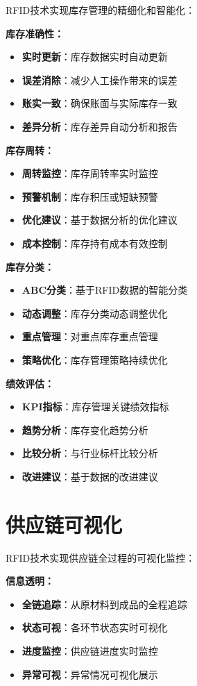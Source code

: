 \documentclass[12pt,UTF8]{ctexbook}
\begin{document}
\begin{itemize}[leftmargin=3.5em]
\begin{itemize}[leftmargin=3.5em]
RFID技术实现库存管理的精细化和智能化：

\textbf{库存准确性：}
\begin{itemize}[leftmargin=3.5em]
    \item \textbf{实时更新}：库存数据实时自动更新
    \item \textbf{误差消除}：减少人工操作带来的误差
    \item \textbf{账实一致}：确保账面与实际库存一致
    \item \textbf{差异分析}：库存差异自动分析和报告
\end{itemize}

\textbf{库存周转：}
\begin{itemize}[leftmargin=3.5em]
    \item \textbf{周转监控}：库存周转率实时监控
    \item \textbf{预警机制}：库存积压或短缺预警
    \item \textbf{优化建议}：基于数据分析的优化建议
    \item \textbf{成本控制}：库存持有成本有效控制
\end{itemize}

\textbf{库存分类：}
\begin{itemize}[leftmargin=3.5em]
    \item \textbf{ABC分类}：基于RFID数据的智能分类
    \item \textbf{动态调整}：库存分类动态调整优化
    \item \textbf{重点管理}：对重点库存重点管理
    \item \textbf{策略优化}：库存管理策略持续优化
\end{itemize}

\textbf{绩效评估：}
\begin{itemize}[leftmargin=3.5em]
    \item \textbf{KPI指标}：库存管理关键绩效指标
    \item \textbf{趋势分析}：库存变化趋势分析
    \item \textbf{比较分析}：与行业标杆比较分析
    \item \textbf{改进建议}：基于数据的改进建议
\end{itemize}

\section{供应链可视化}

RFID技术实现供应链全过程的可视化监控：

\textbf{信息透明：}
\begin{itemize}[leftmargin=3.5em]
    \item \textbf{全链追踪}：从原材料到成品的全程追踪
    \item \textbf{状态可视}：各环节状态实时可视化
    \item \textbf{进度监控}：供应链进度实时监控
    \item \textbf{异常可视}：异常情况可视化展示
\end{itemize}


\end{itemize}
\end{itemize}
\end{document}
